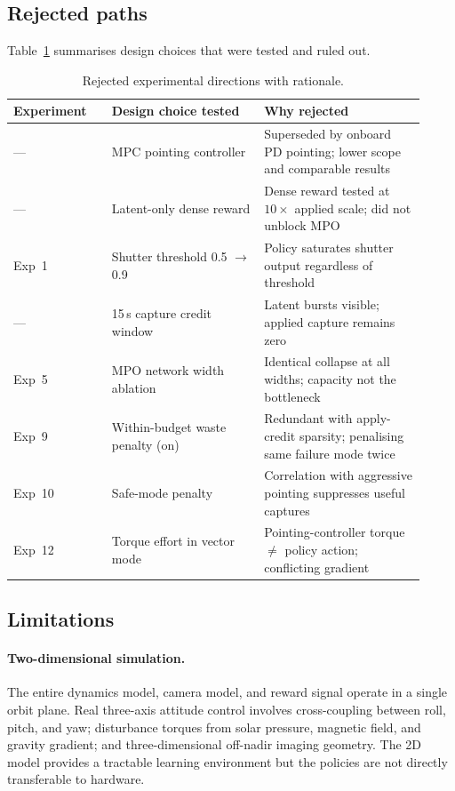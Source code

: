 \subsection{Rejected paths}
\label{sec:discussion-rejected}

Table~\ref{tab:rejected} summarises design choices that were tested and ruled out.

\begin{table}[htbp]
  \centering
  \caption{Rejected experimental directions with rationale.}
  \label{tab:rejected}
  \begin{tabular}{p{0.22\linewidth}p{0.34\linewidth}p{0.36\linewidth}}
    \toprule
    Experiment & Design choice tested & Why rejected \\
    \midrule
    --- & MPC pointing controller & Superseded by onboard PD pointing; lower scope and comparable results \\
    --- & Latent-only dense reward & Dense reward tested at $10\times$ applied scale; did not unblock MPO \\
    Exp~1 & Shutter threshold 0.5 $\to$ 0.9 & Policy saturates shutter output regardless of threshold \\
    --- & 15\,s capture credit window & Latent bursts visible; applied capture remains zero \\
    Exp~5 & MPO network width ablation & Identical collapse at all widths; capacity not the bottleneck \\
    Exp~9 & Within-budget waste penalty (on) & Redundant with apply-credit sparsity; penalising same failure mode twice \\
    Exp~10 & Safe-mode penalty & Correlation with aggressive pointing suppresses useful captures \\
    Exp~12 & Torque effort in vector mode & Pointing-controller torque $\neq$ policy action; conflicting gradient \\
    \bottomrule
  \end{tabular}
\end{table}

\subsection{Limitations}
\label{sec:limitations}

\paragraph{Two-dimensional simulation.}
The entire dynamics model, camera model, and reward signal operate in a single orbit plane.
Real three-axis attitude control involves cross-coupling between roll, pitch, and yaw;
disturbance torques from solar pressure, magnetic field, and gravity gradient; and
three-dimensional off-nadir imaging geometry.
The 2D model provides a tractable learning environment but the policies are not directly
transferable to hardware.

